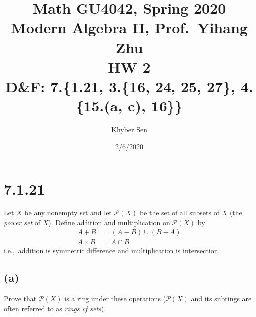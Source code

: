 \documentclass[fleqn]{article}
\title{
Math GU4042, Spring 2020 \\
Modern Algebra II, Prof.\ Yihang Zhu \\
HW 2 \\
D\&F: 7.\{1.21, 3.\{16, 24, 25, 27\}, 4.\{15.(a, c), 16\}\}
}
\author{Khyber Sen}
\date{2/6/2020}
\begin{document}
    
    \maketitle
    
    \section{7.1.21}
    Let $X$ be any nonempty set and let $\mathcal{P}(X)$ be the set of all subsets of $X$ (the \textit{power set} of $X$).  Define addition and multiplication on $\mathcal{P}(X)$ by
    \begin{align}
        A + B &= (A - B) \cup (B - A) \\
        A \times B &= A \cap B
    \end{align}
    i.e.,\ addition is symmetric difference and multiplication is intersection.
        
        \subsection{(a)}
        Prove that $\mathcal{P}(X)$ is a ring under these operations ($\mathcal{P}(X)$ and its subrings are often referred to as \textit{rings of sets}).
            
\end{document}
